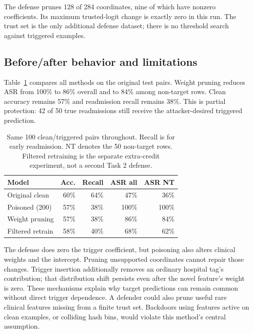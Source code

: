 \documentclass[letterpaper,twocolumn,10pt]{article}
\begin{document}
The defense prunes 128 of 284 coordinates, nine of which have nonzero coefficients. Its maximum trusted-logit change is exactly zero in this run. The trust set is the only additional defense dataset; there is no threshold search against triggered examples.

\subsection{Before/after behavior and limitations}
Table~\ref{tab:defense} compares all methods on the original test pairs. Weight pruning reduces ASR from 100\% to 86\% overall and to 84\% among non-target rows. Clean accuracy remains 57\% and readmission recall remains 38\%. This is partial protection: 42 of 50 true readmissions still receive the attacker-desired triggered prediction.

\begin{table}[t]
\centering\small
\setlength{\tabcolsep}{4pt}
\begin{tabular}{lrrrr}
\toprule
Model & Acc. & Recall & ASR all & ASR NT\\
\midrule
Original clean & 60\% & 64\% & 47\% & 36\%\\
Poisoned (200) & 57\% & 38\% & 100\% & 100\%\\
Weight pruning & 57\% & 38\% & 86\% & 84\%\\
Filtered retrain & 58\% & 40\% & 68\% & 62\%\\
\bottomrule
\end{tabular}
\caption{Same 100 clean/triggered pairs throughout. Recall is for early readmission. NT denotes the 50 non-target rows. Filtered retraining is the separate extra-credit experiment, not a second Task 2 defense.}
\label{tab:defense}
\end{table}

The defense does zero the trigger coefficient, but poisoning also alters clinical weights and the intercept. Pruning unsupported coordinates cannot repair those changes. Trigger insertion additionally removes an ordinary hospital tag's contribution; that distribution shift persists even after the novel feature's weight is zero. These mechanisms explain why target predictions can remain common without direct trigger dependence. A defender could also prune useful rare clinical features missing from a finite trust set. Backdoors using features active on clean examples, or colliding hash bins, would violate this method's central assumption.
\end{document}
